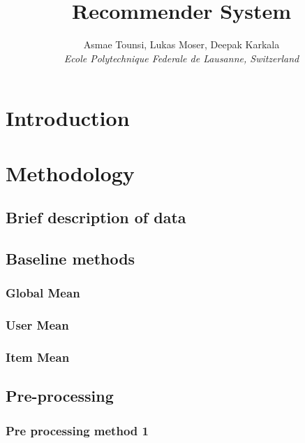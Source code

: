 \documentclass[10pt,conference,compsocconf]{IEEEtran}
\begin{document}
\title{Recommender System}

\author{
   Asmae Tounsi, Lukas Moser, Deepak Karkala \\
  \textit{Ecole Polytechnique Federale de Lausanne, Switzerland}
}

\maketitle

\begin{abstract}
  
\end{abstract}

\section{Introduction}



\section{Methodology}
\label{sec:tips-writing}

\subsection{Brief description of data}

\subsection{Baseline methods}
\subsubsection{Global Mean}
\subsubsection{User Mean}
\subsubsection{Item Mean}

\subsection{Pre-processing}
\subsubsection{Pre processing method 1}
\end{document}
